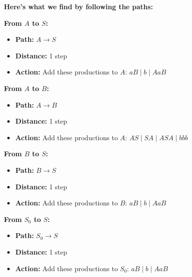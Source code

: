 \documentclass{article}
\begin{document}
\vspace{0.3cm}

\noindent\textbf{Here's what we find by following the paths:}


\begin{tcolorbox}[colback=blue!5!white,colframe=blue!75!black,title=Path Discovery \#1]
\textbf{From $A$ to $S$:}
\begin{itemize}
    \item \textbf{Path:} $A  \to S$
    \item \textbf{Distance:} 1 step
    \item \textbf{Action:} Add these productions to $A$: \quad $aB \mid b \mid AaB$
\end{itemize}
\end{tcolorbox}

\begin{tcolorbox}[colback=blue!5!white,colframe=blue!75!black,title=Path Discovery \#2]
\textbf{From $A$ to $B$:}
\begin{itemize}
    \item \textbf{Path:} $A  \to B$
    \item \textbf{Distance:} 1 step
    \item \textbf{Action:} Add these productions to $A$: \quad $AS \mid SA \mid ASA \mid bbb$
\end{itemize}
\end{tcolorbox}

\begin{tcolorbox}[colback=blue!5!white,colframe=blue!75!black,title=Path Discovery \#3]
\textbf{From $B$ to $S$:}
\begin{itemize}
    \item \textbf{Path:} $B  \to S$
    \item \textbf{Distance:} 1 step
    \item \textbf{Action:} Add these productions to $B$: \quad $aB \mid b \mid AaB$
\end{itemize}
\end{tcolorbox}

\begin{tcolorbox}[colback=blue!5!white,colframe=blue!75!black,title=Path Discovery \#4]
\textbf{From $S_0$ to $S$:}
\begin{itemize}
    \item \textbf{Path:} $S_0  \to S$
    \item \textbf{Distance:} 1 step
    \item \textbf{Action:} Add these productions to $S_0$: \quad $aB \mid b \mid AaB$
\end{itemize}
\end{tcolorbox}
\end{document}
